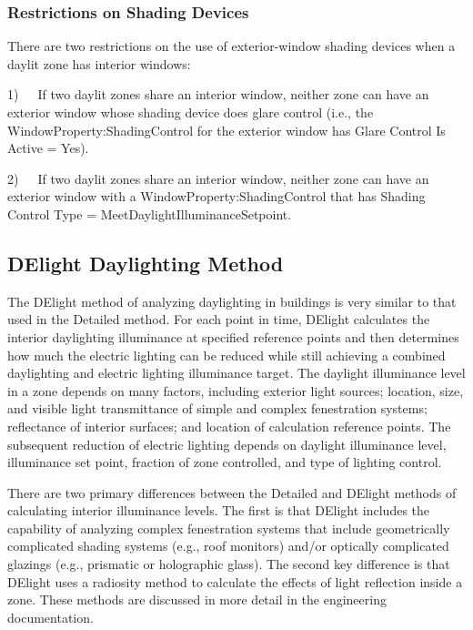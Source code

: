 \subsubsection{Restrictions on Shading Devices}\label{restrictions-on-shading-devices}

There are two restrictions on the use of exterior-window shading devices when a daylit zone has interior windows:

1)~~~If two daylit zones share an interior window, neither zone can have an exterior window whose shading device does glare control (i.e., the WindowProperty:ShadingControl for the exterior window has Glare Control Is Active = Yes).

2)~~~If two daylit zones share an interior window, neither zone can have an exterior window with a WindowProperty:ShadingControl that has Shading Control Type = MeetDaylightIlluminanceSetpoint.

\subsection{DElight Daylighting Method}\label{delight-daylighting-method}

The DElight method of analyzing daylighting in buildings is very similar to that used in the Detailed method. For each point in time, DElight calculates the interior daylighting illuminance at specified reference points and then determines how much the electric lighting can be reduced while still achieving a combined daylighting and electric lighting illuminance target. The daylight illuminance level in a zone depends on many factors, including exterior light sources; location, size, and visible light transmittance of simple and complex fenestration systems; reflectance of interior surfaces; and location of calculation reference points. The subsequent reduction of electric lighting depends on daylight illuminance level, illuminance set point, fraction of zone controlled, and type of lighting control.

There are two primary differences between the Detailed and DElight methods of calculating interior illuminance levels. The first is that DElight includes the capability of analyzing complex fenestration systems that include geometrically complicated shading systems (e.g., roof monitors) and/or optically complicated glazings (e.g., prismatic or holographic glass). The second key difference is that DElight uses a radiosity method to calculate the effects of light reflection inside a zone. These methods are discussed in more detail in the engineering documentation.

